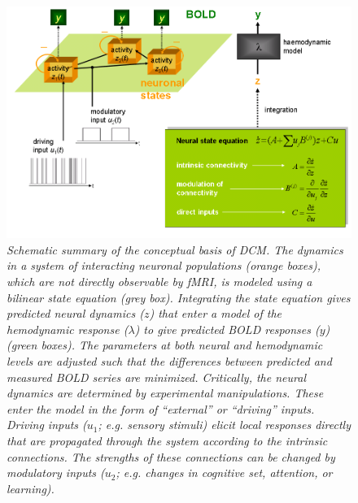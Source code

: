 \begin{figure}[ht]
\begin{center}
\includegraphics[width=130mm]{dcm/Fig2}
\caption{\em Schematic summary of the conceptual basis of DCM.  The dynamics in a system of interacting neuronal populations (orange boxes), which are not directly observable by fMRI, is modeled using a bilinear state equation (grey box).  Integrating the state equation gives predicted neural dynamics ($z$) that enter a model of the hemodynamic response ($\lambda$) to give predicted BOLD responses ($y$) (green boxes).  The parameters at both neural and hemodynamic levels are adjusted such that the differences between predicted and measured BOLD series are minimized.  Critically, the neural dynamics are determined by experimental manipulations.  These enter the model in the form of ``external'' or ``driving'' inputs.  Driving inputs ($u_1$; e.g. sensory stimuli) elicit local responses directly that are propagated through the system according to the intrinsic connections.  The strengths of these connections can be changed by modulatory inputs ($u_2$; e.g. changes in cognitive set, attention, or learning).\label{dcm_fig2}}
\end{center}
\end{figure}

